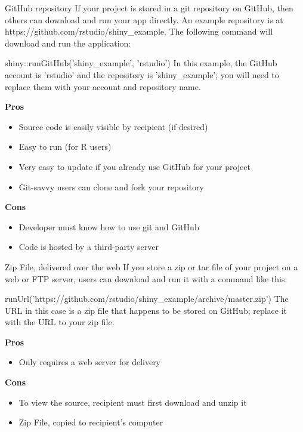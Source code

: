 \begin{frame}
GitHub repository
If your project is stored in a git repository on GitHub, then others can download and run your app directly. An example repository is at https://github.com/rstudio/shiny_example. The following command will download and run the application:

shiny::runGitHub('shiny_example', 'rstudio')
In this example, the GitHub account is 'rstudio' and the repository is 'shiny_example'; you will need to replace them with your account and repository name.

\textbf{Pros} \begin{itemize}
\item  Source code is easily visible by recipient (if desired)
\item Easy to run (for R users)
\item Very easy to update if you already use GitHub for your project
\item Git-savvy users can clone and fork your repository
\end{itemize} \textbf{Cons} \begin{itemize}
\item Developer must know how to use git and GitHub
\item Code is hosted by a third-party server
\end{itemize}
\end{frame}
\begin{frame}
Zip File, delivered over the web
If you store a zip or tar file of your project on a web or FTP server, users can download and run it with a command like this:

runUrl('https://github.com/rstudio/shiny_example/archive/master.zip')
The URL in this case is a zip file that happens to be stored on GitHub; replace it with the URL to your zip file.

\textbf{Pros} \begin{itemize}
\item Only requires a web server for delivery
\end{itemize} \textbf{Cons} \begin{itemize}
\item To view the source, recipient must first download and unzip it
\item Zip File, copied to recipient’s computer
\end{itemize}
\end{frame}
